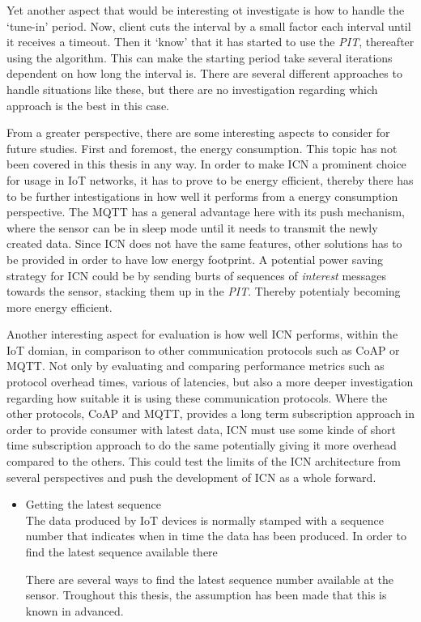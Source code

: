 Yet another aspect that would be interesting ot investigate is how to handle the `tune-in' period. Now, client cuts the interval by a small factor each interval until it receives a timeout. Then it `know' that it has started to use the \textit{PIT}, thereafter using the algorithm. This can make the starting period take several iterations dependent on how long the interval is. There are several different approaches to handle situations like these, but there are no investigation regarding which approach is the best in this case.

From a greater perspective, there are some interesting aspects to consider for future studies. First and foremost, the energy consumption. This topic has not been covered in this thesis in any way. In order to make ICN a prominent choice for usage in IoT networks, it has to prove to be energy efficient, thereby there has to be further intestigations in how well it performs from a energy consumption perspective. The MQTT has a general advantage here with its push mechanism, where the sensor can be in sleep mode until it needs to transmit the newly created data. Since ICN does not have the same features, other solutions has to be provided in order to have low energy footprint. A potential power saving strategy for ICN could be by sending burts of sequences of \textit{interest} messages towards the sensor, stacking them up in the \textit{PIT}. Thereby potentialy becoming more energy efficient. 

Another interesting aspect for evaluation is how well ICN performs, within the IoT domian, in comparison to other communication protocols such as CoAP or MQTT. Not only by evaluating and comparing performance metrics such as protocol overhead times, various of latencies, but also a more deeper investigation regarding how suitable it is using these communication protocols. Where the other protocols, CoAP and MQTT, provides a long term subscription approach in order to provide consumer with latest data, ICN must use some kinde of short time subscription approach to do the same potentially giving it more overhead compared to the others.
This could test the limits of the ICN architecture from several perspectives and push the development of ICN as a whole forward.


\begin{itemize}
\item Getting the latest sequence\\
The data produced by IoT devices is normally stamped with a sequence number that indicates when in time the data has been produced. In order to find the latest sequence available there 

There are several ways to find the latest sequence number available at the sensor. Troughout this thesis, the assumption has been made that this is known in advanced. 

\end{itemize}



